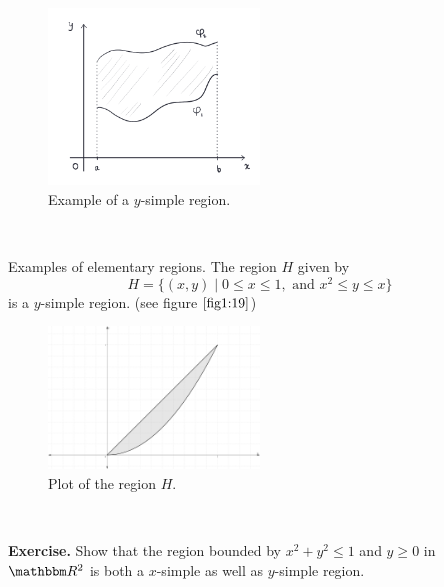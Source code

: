 \documentclass[Analysis-3.tex]{subfiles}
\begin{document}
\begin{figure}[H]
    \centering
    \includegraphics[width=0.5\textwidth]{figures/ysimpleRegion.png}
    \caption{Example of a $y$-simple region.}
\end{figure}

\ 

\begin{Eg}{Examples of elementary regions.}
    The region $H$ given by 
\[
    H = \{ (x,y) \mid 0 \leq x \leq 1, \mbox{ and } x^2 \leq y \leq x \}    
\]
is a $y$-simple region. (see figure $\ref{fig1:19}$) 
\begin{figure}[H]
    \centering
    \includegraphics[width=0.5\textwidth]{figures/simpleRegion.png}  
    \caption{Plot of the region $H$.}
    \label{fig1:19}  
\end{figure}
\end{Eg}
\

\textbf{Exercise.} Show that the region bounded by $x^2 + y^2 \leq 1$ and $y \geq 0$ in $\R^2$ is both a $x$-simple as well as $y$-simple region. 
\end{document}
